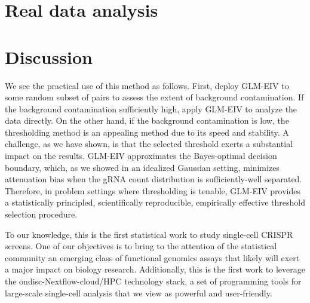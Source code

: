 \documentclass[12pt]{article}
\begin{document}
\section{Real data analysis}


\section{Discussion}

We see the practical use of this method as follows. First, deploy GLM-EIV to some random subset of pairs to assess the extent of background contamination. If the background contamination sufficiently high, apply GLM-EIV to analyze the data directly. On the other hand, if the background contamination is low, the thresholding method is an appealing method due to its speed and stability. A challenge, as we have shown, is that the selected threshold exerts a substantial impact on the results. GLM-EIV approximates the Bayes-optimal decision boundary, which, as we showed in an idealized Gaussian setting, minimizes attenuation bias when the gRNA count distribution is sufficiently-well separated. Therefore, in problem settings where thresholding is tenable, GLM-EIV provides a statistically principled, scientifically reproducible, empirically effective threshold selection procedure.

To our knowledge, this is the first statistical work to study single-cell CRISPR screens. One of our objectives is to bring to the attention of the statistical community an emerging class of functional genomics assays that likely will exert a major impact on biology research. Additionally, this is the first work to leverage the ondisc-Nextflow-cloud/HPC technology stack, a set of programming tools for large-scale single-cell analysis that we view as powerful and user-friendly.
\end{document}
